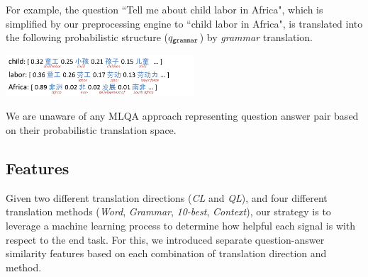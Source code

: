 \documentclass{sig-alternate-05-2015}
\newcommand{\red}[1]{\textcolor{red}{#1}}
\begin{document}
\vspace{-0.25cm}
For example, the question ``Tell me about child 
labor in Africa", which is simplified by our preprocessing engine to ``child labor in Africa", is translated into the following 
probabilistic structure ($q_{{\tt grammar}}$) by \emph{grammar} translation.

\includegraphics[width=7cm]{example.pdf}
\vspace{-0.1cm}

We are unaware of any MLQA approach representing question answer pair based on their probabilistic translation
space.
 
\subsection{Features}\label{sec:feat}


Given two different translation directions (\emph{CL} and \emph{QL}), and four different translation methods (\emph{Word}, 
\emph{Grammar}, \emph{10-best}, \emph{Context}), our strategy is to leverage a machine learning process to determine how 
helpful each signal is with respect to the end task. For this, we introduced separate question-answer similarity features based 
on each combination of translation direction and method. 
\end{document}
